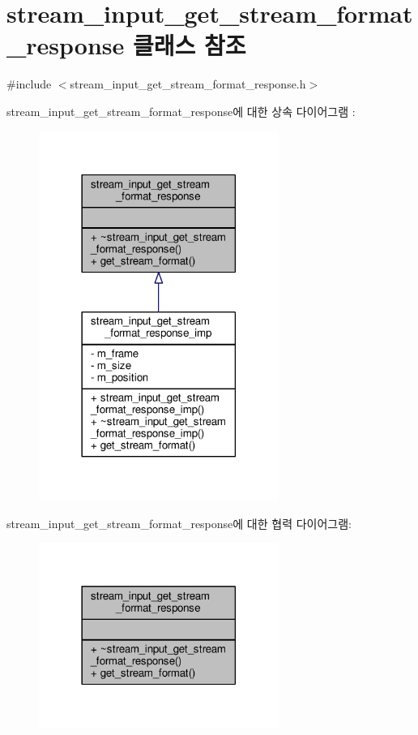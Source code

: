 \hypertarget{classavdecc__lib_1_1stream__input__get__stream__format__response}{}\section{stream\+\_\+input\+\_\+get\+\_\+stream\+\_\+format\+\_\+response 클래스 참조}
\label{classavdecc__lib_1_1stream__input__get__stream__format__response}


{\ttfamily \#include $<$stream\+\_\+input\+\_\+get\+\_\+stream\+\_\+format\+\_\+response.\+h$>$}



stream\+\_\+input\+\_\+get\+\_\+stream\+\_\+format\+\_\+response에 대한 상속 다이어그램 \+: 
\nopagebreak
\begin{figure}[H]
\begin{center}
\leavevmode
\includegraphics[width=222pt]{classavdecc__lib_1_1stream__input__get__stream__format__response__inherit__graph}
\end{center}
\end{figure}


stream\+\_\+input\+\_\+get\+\_\+stream\+\_\+format\+\_\+response에 대한 협력 다이어그램\+:
\nopagebreak
\begin{figure}[H]
\begin{center}
\leavevmode
\includegraphics[width=222pt]{classavdecc__lib_1_1stream__input__get__stream__format__response__coll__graph}
\end{center}
\end{figure}
